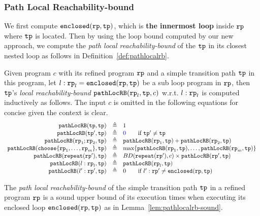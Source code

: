 \subsubsection{Path Local Reachability-bound}
We first compute $\mathtt{enclosed}(\mathtt{rp}, \mathtt{tp})$, which is \textbf{the innermost loop} inside $\mathtt{rp}$ where $\mathtt{tp}$ is located. Then by using the loop bound computed by our new approach, we compute the \emph{path local reachability-bound} of
the $\mathtt{tp}$ in its closest nested loop as follows in Definition~\ref{def:pathlocalrb}.
\begin{defn}
    \label{def:pathlocalrb}
    Given program $c$ with its refined program $\mathtt{rp}$ and a simple transition path $\mathtt{tp}$ in this program, 
    let $l: \mathtt{rp}_l = \mathtt{enclosed}(\mathtt{rp}, \mathtt{tp})$ be a sub loop program in $\mathtt{rp}$,
    then $\mathtt{tp}$'s \emph{local reachability-bound} $\mathtt{pathLocRB}(\mathtt{rp}_l, \mathtt{tp}, c)$ w.r.t. $l: \mathtt{rp}_l$
    is computed inductively as follows.
    The input $c$ is omitted in the following equations for concise given the context is clear.
    {\small
    \[
    \begin{array}{rcl}
      \outinB(\tpath, \tpath) & \triangleq & 1 \\
      \outinB(\tpath', \tpath) & \triangleq & \highlight{0} \qquad \text{if } \tpath' \neq \tpath\\
      \outinB(\rprog_1;\rprog_2, \tpath) & \triangleq & \outinB(\rprog_1, \tpath) + \outinB(\rprog_2, \tpath) \\
      \outinB(\rpchoose{\rprog_1, \ldots, \rprog_m }, \tpath) & \triangleq 
      & \max\left\{ \outinB(\rprog_1, \tpath), \ldots, \outinB(\rprog_m, \tpath) \right\} \\
      \outinB(\rprepeat(\rprog'), \tpath) & \triangleq 
      & BD(\rprepeat(\rprog'), c) \times \outinB(\rprog', \tpath)
       \\
       \outinB(l: \rprog_l, \tpath) & \triangleq & \outinB(\rprog_l, \tpath) \\
       \outinB(l': \rprog', \tpath) & \triangleq & 0  \qquad \text{if } l': \rprog' \neq \kw{enclosed}(\rprog, \tpath)
    \end{array}
    \]
    }
  \end{defn}
  The \emph{path local reachability-bound} of the simple transition path $\mathtt{tp}$ in a refined program $\mathtt{rp}$ is a sound upper bound of its execution times when executing its enclosed loop $\mathtt{enclosed}(\mathtt{rp}, \mathtt{tp})$ as in Lemma~\ref{lem:pathlocalrb-sound}.
